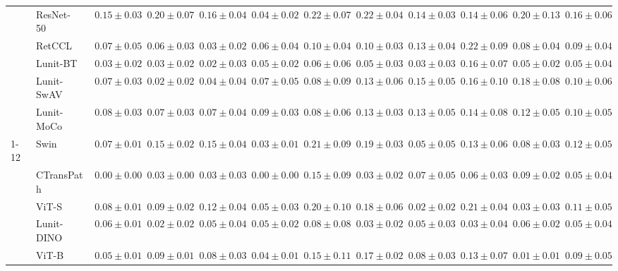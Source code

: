 \begin{tabular}{ll|cccc|c|cccc|c}
 & ResNet-50~\cite{he2015deep} & $0.15 \pm 0.03$ & $0.20 \pm 0.07$ & $0.16 \pm 0.04$ & $0.04 \pm 0.02$ & $0.22 \pm 0.07$ & $0.22 \pm 0.04$ & $0.14 \pm 0.03$ & $0.14 \pm 0.06$ & $0.20 \pm 0.13$ & $0.16 \pm 0.06$ \\
 & RetCCL~\cite{wang2023retccl} & $0.07 \pm 0.05$ & $0.06 \pm 0.03$ & $0.03 \pm 0.02$ & $0.06 \pm 0.04$ & $0.10 \pm 0.04$ & $0.10 \pm 0.03$ & $0.13 \pm 0.04$ & $0.22 \pm 0.09$ & $0.08 \pm 0.04$ & $0.09 \pm 0.04$ \\
 & Lunit-BT~\cite{kang2023benchmarking} & $0.03 \pm 0.02$ & $0.03 \pm 0.02$ & $0.02 \pm 0.03$ & $0.05 \pm 0.02$ & $0.06 \pm 0.06$ & $0.05 \pm 0.03$ & $\mathbf{0.03 \pm 0.03}$ & $0.16 \pm 0.07$ & $0.05 \pm 0.02$ & $0.05 \pm 0.04$ \\
 & Lunit-SwAV~\cite{kang2023benchmarking} & $0.07 \pm 0.03$ & $0.02 \pm 0.02$ & $0.04 \pm 0.04$ & $0.07 \pm 0.05$ & $0.08 \pm 0.09$ & $0.13 \pm 0.06$ & $0.15 \pm 0.05$ & $0.16 \pm 0.10$ & $0.18 \pm 0.08$ & $0.10 \pm 0.06$ \\
 & Lunit-MoCo~\cite{kang2023benchmarking} & $0.08 \pm 0.03$ & $0.07 \pm 0.03$ & $0.07 \pm 0.04$ & $0.09 \pm 0.03$ & $0.08 \pm 0.06$ & $0.13 \pm 0.03$ & $0.13 \pm 0.05$ & $0.14 \pm 0.08$ & $0.12 \pm 0.05$ & $0.10 \pm 0.05$ \\
\cline{1-12}
\multirow[t]{12}{*}{Mean pool} & Swin~\cite{liu2021swin} & $0.07 \pm 0.01$ & $0.15 \pm 0.02$ & $0.15 \pm 0.04$ & $0.03 \pm 0.01$ & $0.21 \pm 0.09$ & $0.19 \pm 0.03$ & $0.05 \pm 0.05$ & $0.13 \pm 0.06$ & $0.08 \pm 0.03$ & $0.12 \pm 0.05$ \\
 & CTransPath~\cite{wang2022transformer} & $\mathbf{0.00 \pm 0.00}$ & $0.03 \pm 0.00$ & $0.03 \pm 0.03$ & $\mathbf{0.00 \pm 0.00}$ & $0.15 \pm 0.09$ & $0.03 \pm 0.02$ & $0.07 \pm 0.05$ & $0.06 \pm 0.03$ & $0.09 \pm 0.02$ & $0.05 \pm 0.04$ \\
 & ViT-S~\cite{kolesnikov2021image} & $0.08 \pm 0.01$ & $0.09 \pm 0.02$ & $0.12 \pm 0.04$ & $0.05 \pm 0.03$ & $0.20 \pm 0.10$ & $0.18 \pm 0.06$ & $0.02 \pm 0.02$ & $0.21 \pm 0.04$ & $0.03 \pm 0.03$ & $0.11 \pm 0.05$ \\
 & Lunit-DINO~\cite{kang2023benchmarking} & $0.06 \pm 0.01$ & $0.02 \pm 0.02$ & $0.05 \pm 0.04$ & $0.05 \pm 0.02$ & $\mathbf{0.08 \pm 0.08}$ & $0.03 \pm 0.02$ & $0.05 \pm 0.03$ & $0.03 \pm 0.04$ & $0.06 \pm 0.02$ & $\mathbf{0.05 \pm 0.04}$ \\
 & ViT-B~\cite{kolesnikov2021image} & $0.05 \pm 0.01$ & $0.09 \pm 0.01$ & $0.08 \pm 0.03$ & $0.04 \pm 0.01$ & $0.15 \pm 0.11$ & $0.17 \pm 0.02$ & $0.08 \pm 0.03$ & $0.13 \pm 0.07$ & $\mathbf{0.01 \pm 0.01}$ & $0.09 \pm 0.05$ \\

\end{tabular}
